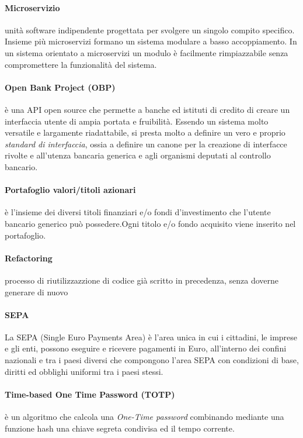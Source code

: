 \paragraph{Microservizio}
unit\`a software indipendente progettata per svolgere un singolo compito specifico. Insieme pi\`u microservizi formano un sistema modulare a basso accoppiamento. In un sistema orientato a microservizi un modulo \`e facilmente rimpiazzabile senza compromettere la funzionalit\`a del sistema.

\paragraph{Open Bank Project (OBP)}
	è una API open source che permette a banche ed istituti di credito di creare un interfaccia utente di ampia portata e fruibilità. Essendo un sistema molto versatile e largamente riadattabile, si presta molto a definire un vero e proprio \emph{standard di interfaccia}, ossia a definire un canone per la creazione di interfacce rivolte e all'utenza bancaria generica e agli organismi deputati al controllo bancario. \cite{obp}
\paragraph{Portafoglio valori/titoli azionari}
	è l'insieme dei diversi titoli finanziari e/o fondi d'investimento che l'utente bancario generico può possedere.Ogni titolo e/o fondo acquisito viene inserito nel portafoglio.
\paragraph{Refactoring}
	processo di riutilizzazzione di codice già scritto in precedenza, senza doverne generare di nuovo
\paragraph{SEPA}
	La SEPA (Single Euro Payments Area) è l’area unica in cui i cittadini, le imprese e gli enti, possono eseguire e ricevere pagamenti in Euro, all’interno dei confini nazionali e tra i paesi diversi che compongono l’area SEPA con condizioni di base, diritti ed obblighi uniformi tra i paesi stessi. 
\paragraph{Time-based One Time Password (TOTP)}
	è un algoritmo che calcola una \emph{One-Time password} combinando mediante una funzione hash una chiave segreta condivisa ed il tempo corrente. \cite{totprfc}
